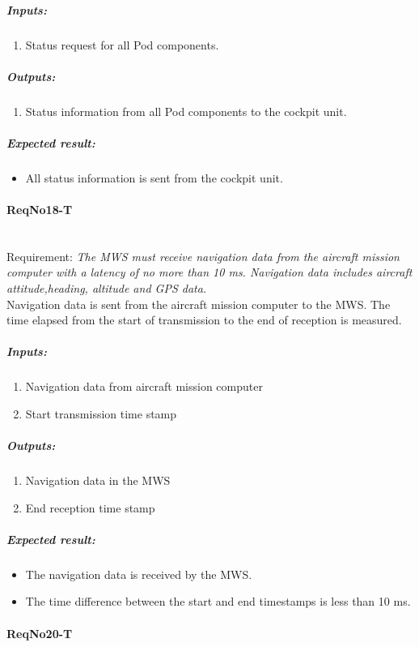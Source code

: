 \subparagraph{Inputs:}
	\begin{enumerate}
	\item Status request for all Pod components.
	\end{enumerate}
\subparagraph{Outputs:}
	\begin{enumerate}
	\item Status information from all Pod components to the cockpit unit.
	\end{enumerate}
\subparagraph{Expected result:}
	\begin{itemize}
	\item All status information is sent from the cockpit unit.
	\end{itemize}


\paragraph{ReqNo18-T}\mbox{}\\ %
Requirement: \textit{The MWS must receive navigation data from the aircraft mission computer with a latency of no more than
10 ms. Navigation data includes aircraft attitude,heading, altitude and GPS data.}\\

Navigation data is sent from the aircraft mission computer to the MWS. The time elapsed from the start of transmission to the end of reception is measured.
\subparagraph{Inputs:}
	\begin{enumerate}
	\item Navigation data from aircraft mission computer
	\item Start transmission time stamp
	\end{enumerate}
\subparagraph{Outputs:}
	\begin{enumerate}
	\item Navigation data in the MWS
	\item End reception time stamp
	\end{enumerate}
\subparagraph{Expected result:}
	\begin{itemize}
	\item The navigation data is received by the MWS.
	\item The time difference between the start and end timestamps is less than 10 ms. 
	\end{itemize}

\paragraph{ReqNo20-T}\mbox{}\\ %

